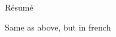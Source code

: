     

        





{ Résumé}
\label{sec:summary-fr}

\begin{outline}
    \1 Same as above, but in french
\end{outline}